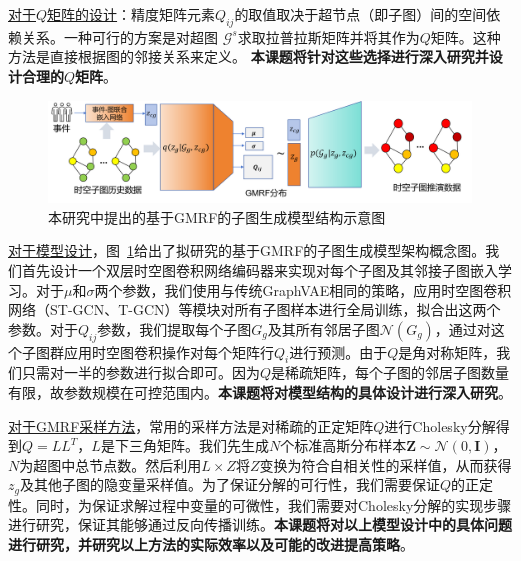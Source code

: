 \documentclass[12pt,UTF8,AutoFakeBold=2,a4paper]{ctexart} %
\begin{document}
\underline{对于$Q$矩阵的设计}：精度矩阵元素$Q_{ij}$的取值取决于超节点（即子图）间的空间依赖关系。一种可行的方案是对超图
$\mathcal{G}^s$求取拉普拉斯矩阵并将其作为$Q$矩阵。这种方法是直接根据图的邻接关系来定义。%
\textbf{本课题将针对这些选择进行深入研究并设计合理的$Q$矩阵}。
\begin{figure}
    \centering
    \includegraphics[width=1\linewidth]{fig/gmrf-vae.png}
    \caption{本研究中提出的基于GMRF的子图生成模型结构示意图}
    \label{fig:gmrf_vae}
\end{figure}

\underline{对于模型设计}，图~\ref{fig:gmrf_vae}给出了拟研究的基于GMRF的子图生成模型架构概念图。我们首先设计一个双层时空图卷积网络编码器来实现对每个子图及其邻接子图嵌入学习。对于$\mu$和$\sigma$两个参数，我们使用与传统GraphVAE相同的策略，应用时空图卷积网络（ST-GCN、T-GCN）等模块对所有子图样本进行全局训练，拟合出这两个参数。对于$Q_{ij}$参数，我们提取每个子图$G_g$及其所有邻居子图$\mathcal{N}(G_g)$，通过对这个子图群应用时空图卷积操作对每个矩阵行$Q_i$进行预测。由于$Q$是角对称矩阵，我们只需对一半的参数进行拟合即可。因为$Q$是稀疏矩阵，每个子图的邻居子图数量有限，故参数规模在可控范围内。\textbf{本课题将对模型结构的具体设计进行深入研究}。

\underline{对于GMRF采样方法}，常用的采样方法是对稀疏的正定矩阵$Q$进行Cholesky分解得到$Q=LL^T$，$L$是下三角矩阵。我们先生成$N$个标准高斯分布样本$\mathbf{Z}\sim\mathcal{N}(0, \mathbf{I})$，$N$为超图中总节点数。然后利用$L\times Z$将$Z$变换为符合自相关性的采样值，从而获得$z_g$及其他子图的隐变量采样值。为了保证分解的可行性，我们需要保证$Q$的正定性。同时，为保证求解过程中变量的可微性，我们需要对Cholesky分解的实现步骤进行研究，保证其能够通过反向传播训练。\textbf{本课题将对以上模型设计中的具体问题进行研究，并研究以上方法的实际效率以及可能的改进提高策略}。
\end{document}
